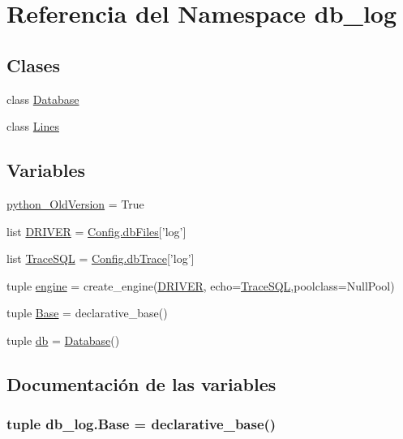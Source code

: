 \hypertarget{namespacedb__log}{\section{Referencia del Namespace db\-\_\-log}
\label{namespacedb__log}
}
\subsection*{Clases}
\begin{DoxyCompactItemize}
\item 
class \hyperlink{classdb__log_1_1_database}{Database}
\item 
class \hyperlink{classdb__log_1_1_lines}{Lines}
\end{DoxyCompactItemize}
\subsection*{Variables}
\begin{DoxyCompactItemize}
\item 
\hyperlink{namespacedb__log_afc79f78c97078e4f04bab40c7263cdda}{python\-\_\-\-Old\-Version} = True
\item 
list \hyperlink{namespacedb__log_aca93446ca8bacea6ca9dd645f0530ba3}{D\-R\-I\-V\-E\-R} = \hyperlink{class_config_1_1_config_a62ca676b07391529a5c1abd433bed57f}{Config.\-db\-Files}\mbox{[}'log'\mbox{]}
\item 
list \hyperlink{namespacedb__log_ad132a586866e641593afdf5e56e1e8f7}{Trace\-S\-Q\-L} = \hyperlink{class_config_1_1_config_af7a49b43885faa51f5f5b5687a05120c}{Config.\-db\-Trace}\mbox{[}'log'\mbox{]}
\item 
tuple \hyperlink{namespacedb__log_a42129d882358fd3e758cc0a07676f45d}{engine} = create\-\_\-engine(\hyperlink{namespacedb__log_aca93446ca8bacea6ca9dd645f0530ba3}{D\-R\-I\-V\-E\-R}, echo=\hyperlink{namespacedb__log_ad132a586866e641593afdf5e56e1e8f7}{Trace\-S\-Q\-L},poolclass=Null\-Pool)
\item 
tuple \hyperlink{namespacedb__log_a38ab36859074003153c593a6833deca1}{Base} = declarative\-\_\-base()
\item 
tuple \hyperlink{namespacedb__log_aba9234ce5907ed35a58854aa5f6fd18c}{db} = \hyperlink{classdb__log_1_1_database}{Database}()
\end{DoxyCompactItemize}


\subsection{Documentación de las variables}
\hypertarget{namespacedb__log_a38ab36859074003153c593a6833deca1}{
\subsubsection[{Base}]{\setlength{\rightskip}{0pt plus 5cm}tuple db\-\_\-log.\-Base = declarative\-\_\-base()}}\label{namespacedb__log_a38ab36859074003153c593a6833deca1}


